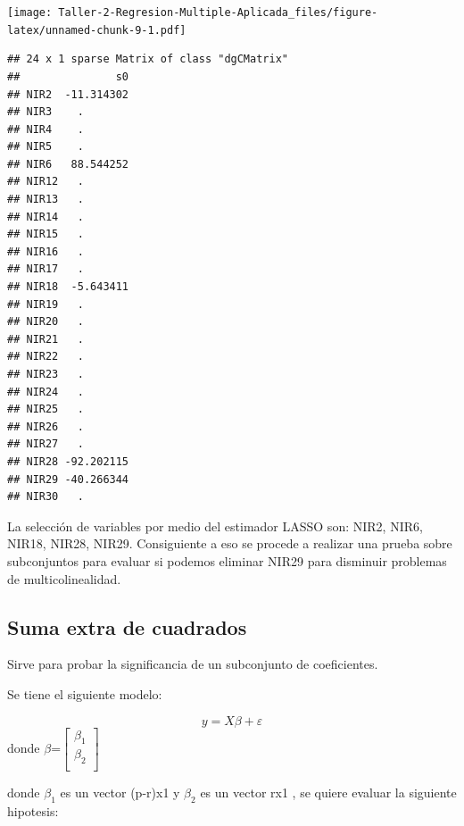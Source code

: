 \documentclass[
]{article}
\newenvironment{Shaded}{\begin{snugshade}}{\end{snugshade}}
\newcommand{\AttributeTok}[1]{\textcolor[rgb]{0.77,0.63,0.00}{#1}}
\newcommand{\DecValTok}[1]{\textcolor[rgb]{0.00,0.00,0.81}{#1}}
\newcommand{\FloatTok}[1]{\textcolor[rgb]{0.00,0.00,0.81}{#1}}
\newcommand{\FunctionTok}[1]{\textcolor[rgb]{0.00,0.00,0.00}{#1}}
\newcommand{\NormalTok}[1]{#1}
\newcommand{\OtherTok}[1]{\textcolor[rgb]{0.56,0.35,0.01}{#1}}
\newcommand{\SpecialCharTok}[1]{\textcolor[rgb]{0.00,0.00,0.00}{#1}}
\begin{document}
\texttt{[image: Taller-2-Regresion-Multiple-Aplicada\_files/figure-latex/unnamed-chunk-9-1.pdf]}

\begin{Shaded}
\end{Shaded}

\begin{verbatim}
## 24 x 1 sparse Matrix of class "dgCMatrix"
##               s0
## NIR2  -11.314302
## NIR3    .       
## NIR4    .       
## NIR5    .       
## NIR6   88.544252
## NIR12   .       
## NIR13   .       
## NIR14   .       
## NIR15   .       
## NIR16   .       
## NIR17   .       
## NIR18  -5.643411
## NIR19   .       
## NIR20   .       
## NIR21   .       
## NIR22   .       
## NIR23   .       
## NIR24   .       
## NIR25   .       
## NIR26   .       
## NIR27   .       
## NIR28 -92.202115
## NIR29 -40.266344
## NIR30   .
\end{verbatim}

La selección de variables por medio del estimador LASSO son: NIR2, NIR6,
NIR18, NIR28, NIR29. Consiguiente a eso se procede a realizar una prueba
sobre subconjuntos para evaluar si podemos eliminar NIR29 para disminuir
problemas de multicolinealidad.

\hypertarget{suma-extra-de-cuadrados}{%
\subsection{Suma extra de cuadrados}\label{suma-extra-de-cuadrados}}

Sirve para probar la significancia de un subconjunto de coeficientes.

Se tiene el siguiente modelo:

\[y = X\beta+\varepsilon\] donde
\(\beta\)=\(\begin{bmatrix} \beta_{1}\\ \beta_{2} \\ \end{bmatrix}\)

donde \(\beta_1\) es un vector (p-r)x1 y \(\beta_2\) es un vector rx1 ,
se quiere evaluar la siguiente hipotesis:
\end{document}
